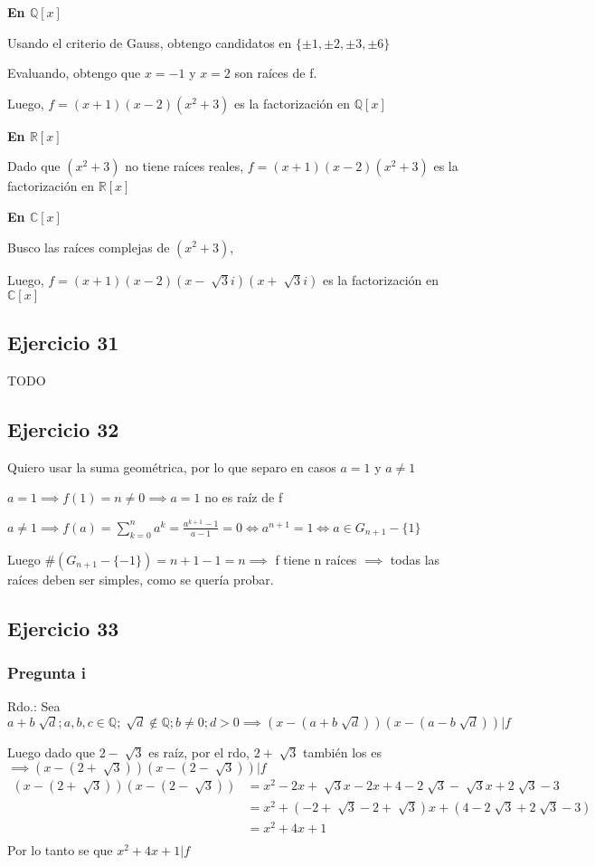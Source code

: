 \textbf{En $ \mathbb{Q}[x] $}

Usando el criterio de Gauss, obtengo candidatos en $ \{ \pm 1, \pm 2, \pm 3, \pm 6 \} $

Evaluando, obtengo que $ x = -1 $ y $ x = 2 $ son raíces de f.

Luego, $ f = (x+1)(x-2)(x^2+3) $ es la factorización en $ \mathbb{Q}[x] $

\textbf{En $ \mathbb{R}[x] $}

Dado que $(x^2+3)$ no tiene raíces reales, $ f = (x+1)(x-2)(x^2+3) $ es la factorización en $ \mathbb{R}[x] $

\textbf{En $ \mathbb{C}[x] $}

Busco las raíces complejas de $ (x^2+3) $,

Luego, $ f = (x+1)(x-2)(x-\sqrt[]{3}i)(x+\sqrt[]{3}i) $ es la factorización en $ \mathbb{C}[x] $

\subsection{Ejercicio 31}
TODO

\subsection{Ejercicio 32}
Quiero usar la suma geométrica, por lo que separo en casos $ a = 1 $ y $ a \neq 1 $

$ a = 1 \implies f(1) = n \neq 0 \implies a = 1 $ no es raíz de f

$ a\neq 1 \implies f(a) = \sum_{k=0}^{n}a^k = \frac{a^{k+1} - 1}{a-1} = 0 \iff a^{n+1} = 1 \iff a \in G_{n+1} - \{ 1 \}$

Luego $ \#(G_{n+1} - \{-1\}) = n+1-1 = n \implies $ f tiene n raíces $ \implies $ todas las raíces deben ser simples, como se quería probar.

\subsection{Ejercicio 33}

\subsubsection{Pregunta i}

Rdo.: Sea $ a+b\sqrt[]{d}; a,b,c \in \mathbb{Q}; \sqrt[]{d} \not \in \mathbb{Q}; b \neq 0; d > 0 \implies (x-(a+b\sqrt[]{d}))(x-(a-b\sqrt[]{d})) | f $ 

Luego dado que $ 2-\sqrt[]{3} $ es raíz, por el rdo, $ 2+\sqrt[]{3} $ también los es $ \implies (x-(2+\sqrt[]{3})) (x-(2-\sqrt[]{3}))|f $
\begin{align*}
    (x-(2+\sqrt[]{3})) (x-(2-\sqrt[]{3})) &= x^2 -2x + \sqrt[]{3}x - 2x + 4 - 2\sqrt[]{3} - \sqrt[]{3}x + 2\sqrt[]{3} - 3 \\
    &= x^2 + (-2+\sqrt[]{3} - 2 + \sqrt[]{3})x + (4-2\sqrt[]{3} + 2\sqrt[]{3} - 3) \\
    &= x^2 + 4x + 1 \\
\end{align*}
Por lo tanto se que $ x^2 + 4x + 1 |f $

